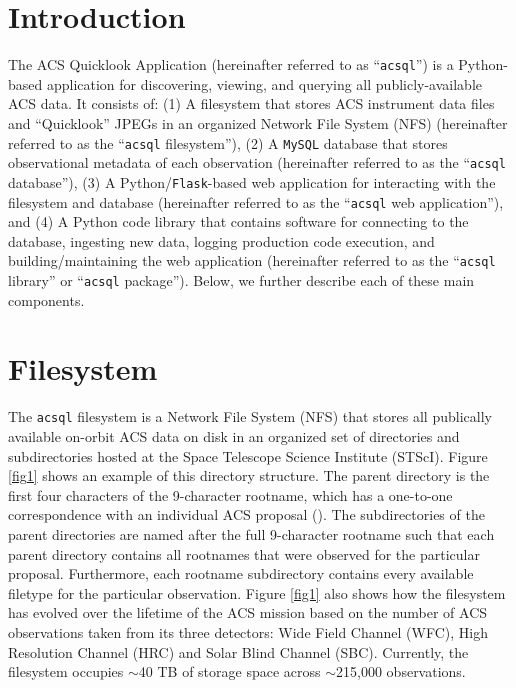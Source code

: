 \documentclass[11pt,twoside]{article}
\begin{document}
\section{Introduction}

The ACS Quicklook Application (hereinafter referred to as ``\texttt{acsql}'') is a Python-based application for discovering, viewing, and
querying all publicly-available ACS data.  It consists of: (1) A filesystem that stores ACS instrument data files
and ``Quicklook'' JPEGs in an organized Network File System (NFS) (hereinafter referred to as the ``\texttt{acsql} filesystem''), (2) A
\texttt{MySQL} database that stores observational metadata of each observation (hereinafter referred to as the ``\texttt{acsql} database''),
(3) A Python/\texttt{Flask}-based web application for interacting with the filesystem and database (hereinafter referred to as the
``\texttt{acsql} web application''), and (4) A Python code library that contains software for connecting to the database, ingesting new data,
logging production code execution, and building/maintaining the web application (hereinafter referred to as the ``\texttt{acsql} library''
or ``\texttt{acsql} package'').  Below, we further describe each of these main components.


\section{Filesystem}

The \texttt{acsql} filesystem is a Network File System (NFS) that stores all publically available on-orbit ACS data on disk in an
organized set of directories and subdirectories hosted at the Space Telescope Science Institute (STScI). Figure \ref{fig1} shows an example of this
directory structure.  The parent directory is the first four characters of the 9-character rootname, which has a one-to-one correspondence with an
individual ACS proposal (\citet{Smith}). The subdirectories of the parent directories are named after the full 9-character rootname such that
each parent directory contains all rootnames that were observed for the particular proposal.  Furthermore, each rootname
subdirectory contains every available filetype for the particular observation. Figure \ref{fig1} also shows how the filesystem has
evolved over the lifetime of the ACS mission based on the number of ACS observations taken from its three detectors: Wide Field Channel (WFC),
High Resolution Channel (HRC) and Solar Blind Channel (SBC).  Currently, the filesystem occupies $\sim${40} TB of storage space across
$\sim$215,000 observations.
\end{document}
